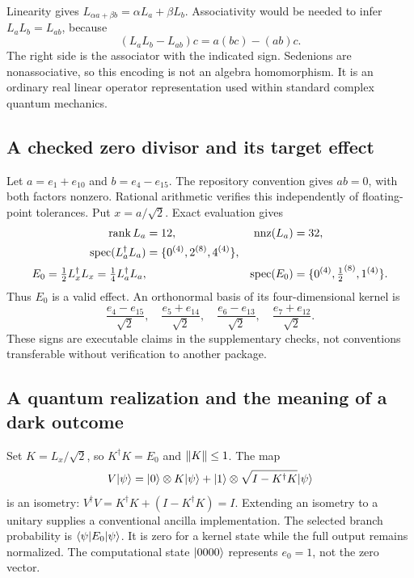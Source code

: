 \documentclass[11pt,a4paper]{article}
\begin{document}
Linearity gives $L_{\alpha a+\beta b}=\alpha L_a+\beta L_b$. Associativity would be needed to infer $L_aL_b=L_{ab}$, because
\begin{equation}
(L_aL_b-L_{ab})c=a(bc)-(ab)c.
\end{equation}
The right side is the associator with the indicated sign. Sedenions are nonassociative, so this encoding is not an algebra homomorphism. It is an ordinary real linear operator representation used within standard complex quantum mechanics.

\subsection{A checked zero divisor and its target effect}
Let $a=e_1+e_{10}$ and $b=e_4-e_{15}$. The repository convention gives $ab=0$, with both factors nonzero. Rational arithmetic verifies this independently of floating-point tolerances. Put $x=a/\sqrt2$. Exact evaluation gives
\begin{align}
\operatorname{rank} L_a&=12,&\operatorname{nnz}(L_a)&=32,\\
\operatorname{spec}(L_a^\dagger L_a)&=\{0^{(4)},2^{(8)},4^{(4)}\},\\
E_0=\tfrac12L_x^\dagger L_x=\tfrac14L_a^\dagger L_a,
&&\operatorname{spec}(E_0)&=\{0^{(4)},\tfrac12^{(8)},1^{(4)}\}.
\end{align}
Thus $E_0$ is a valid effect. An orthonormal basis of its four-dimensional kernel is
\begin{equation}
\frac{e_4-e_{15}}{\sqrt2},\quad
\frac{e_5+e_{14}}{\sqrt2},\quad
\frac{e_6-e_{13}}{\sqrt2},\quad
\frac{e_7+e_{12}}{\sqrt2}.
\end{equation}
These signs are executable claims in the supplementary checks, not conventions transferable without verification to another package.

\subsection{A quantum realization and the meaning of a dark outcome}
Set $K=L_x/\sqrt2$, so $K^\dagger K=E_0$ and $\left\lVert K\right\rVert\le1$. The map
\begin{equation}
V\lvert\psi\rangle=\lvert0\rangle\otimes K\lvert\psi\rangle+
\lvert1\rangle\otimes\sqrt{I-K^\dagger K}\lvert\psi\rangle
\end{equation}
is an isometry: $V^\dagger V=K^\dagger K+(I-K^\dagger K)=I$. Extending an isometry to a unitary supplies a conventional ancilla implementation. The selected branch probability is $\langle\psi\rvert E_0\lvert\psi\rangle$. It is zero for a kernel state while the full output remains normalized. The computational state $\lvert0000\rangle$ represents $e_0=1$, not the zero vector.
\end{document}
